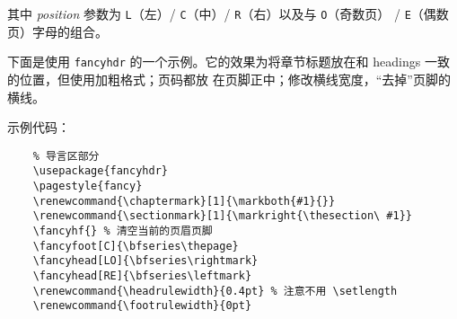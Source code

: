 \documentclass[UTF8]{ctexart}
\begin{document}
其中 \emph{position} 参数为 \texttt{L}（左）/ \texttt{C}（中）/ \texttt{R}（右）以及与 \texttt{O}（奇数页）
/ \texttt{E}（偶数页）字母的组合。

下面是使用 \texttt{fancyhdr} 的一个示例。它的效果为将章节标题放在和 headings 一致的位置，但使用加粗格式；页码都放
在页脚正中；修改横线宽度，“去掉”页脚的横线。

示例代码：
\begin{verbatim}
    % 导言区部分
    \usepackage{fancyhdr}
    \pagestyle{fancy}
    \renewcommand{\chaptermark}[1]{\markboth{#1}{}}
    \renewcommand{\sectionmark}[1]{\markright{\thesection\ #1}}
    \fancyhf{} % 清空当前的页眉页脚
    \fancyfoot[C]{\bfseries\thepage}
    \fancyhead[LO]{\bfseries\rightmark}
    \fancyhead[RE]{\bfseries\leftmark}
    \renewcommand{\headrulewidth}{0.4pt} % 注意不用 \setlength
    \renewcommand{\footrulewidth}{0pt}
\end{verbatim}
\end{document}
